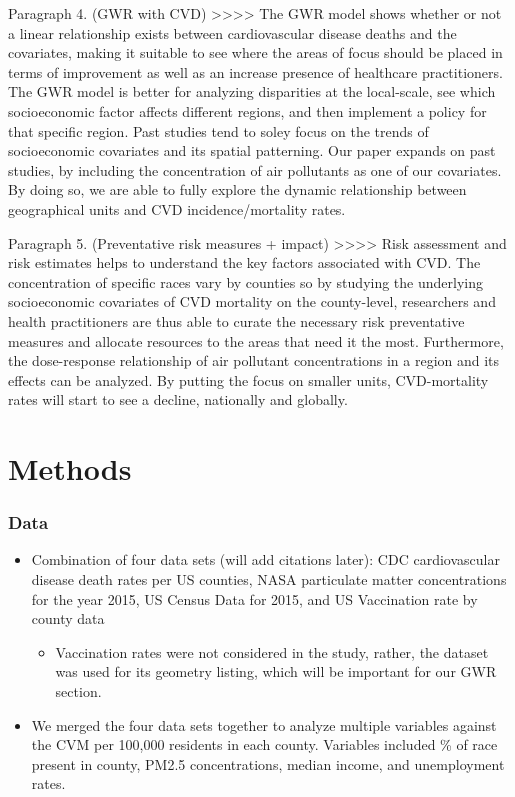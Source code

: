 \documentclass[
]{article}
\providecommand{\tightlist}{%
  \setlength{\itemsep}{0pt}\setlength{\parskip}{0pt}}\usepackage{longtable,booktabs,array}
\begin{document}
Paragraph 4. (GWR with CVD)
\textgreater\textgreater\textgreater\textgreater{} The GWR model shows
whether or not a linear relationship exists between cardiovascular
disease deaths and the covariates, making it suitable to see where the
areas of focus should be placed in terms of improvement as well as an
increase presence of healthcare practitioners. The GWR model is better
for analyzing disparities at the local-scale, see which socioeconomic
factor affects different regions, and then implement a policy for that
specific region. Past studies tend to soley focus on the trends of
socioeconomic covariates and its spatial patterning. Our paper expands
on past studies, by including the concentration of air pollutants as one
of our covariates. By doing so, we are able to fully explore the dynamic
relationship between geographical units and CVD incidence/mortality
rates.

Paragraph 5. (Preventative risk measures + impact)
\textgreater\textgreater\textgreater\textgreater{} Risk assessment and
risk estimates helps to understand the key factors associated with CVD.
The concentration of specific races vary by counties so by studying the
underlying socioeconomic covariates of CVD mortality on the
county-level, researchers and health practitioners are thus able to
curate the necessary risk preventative measures and allocate resources
to the areas that need it the most. Furthermore, the dose-response
relationship of air pollutant concentrations in a region and its effects
can be analyzed. By putting the focus on smaller units, CVD-mortality
rates will start to see a decline, nationally and globally.

\section{Methods}\label{methods}

\subsubsection{Data}\label{data}

\begin{itemize}
\item
  Combination of four data sets (will add citations later): CDC
  cardiovascular disease death rates per US counties, NASA particulate
  matter concentrations for the year 2015, US Census Data for 2015, and
  US Vaccination rate by county data

  \begin{itemize}
  \tightlist
  \item
    Vaccination rates were not considered in the study, rather, the
    dataset was used for its geometry listing, which will be important
    for our GWR section.
  \end{itemize}
\item
  We merged the four data sets together to analyze multiple variables
  against the CVM per 100,000 residents in each county. Variables
  included \% of race present in county, PM2.5 concentrations, median
  income, and unemployment rates.
\end{itemize}
\end{document}
